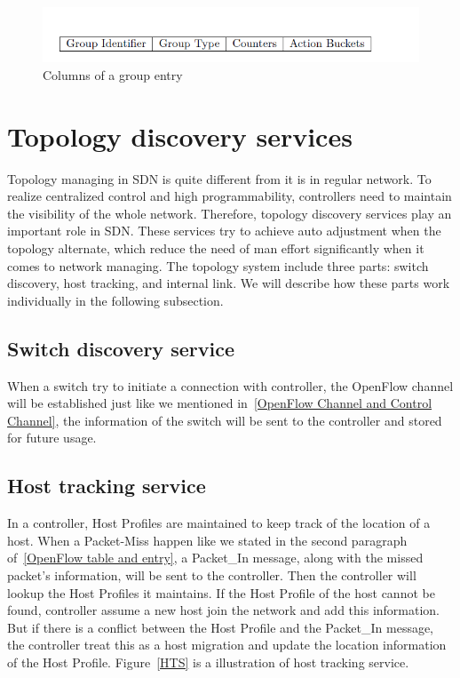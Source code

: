 \begin{figure}[H]
\begin{center} 
\includegraphics[width=1\textwidth]{figures/group_table.png}
\end{center}
\caption{Columns of a group entry}
\label{GE_Col}
\end{figure}

\section{Topology discovery services}
\label{Topology discovery services}
Topology managing in SDN is quite different from it is in regular network. To realize centralized control and high programmability, controllers need to maintain the visibility of the whole network. Therefore, topology discovery services play an important role in SDN. These services try to achieve auto adjustment when the topology alternate, which reduce the need of man effort significantly when it comes to network managing. The topology system include three parts: switch discovery, host tracking, and internal link. We will describe how these parts work individually in the following subsection.

\subsection{Switch discovery service}
\label{Switch discovery service}
When a switch try to initiate a connection with controller, the OpenFlow channel will be established just like we mentioned in~\ref{OpenFlow Channel and Control Channel}, the information of the switch will be sent to the controller and stored for future usage. 

\subsection{Host tracking service}
\label{Host tracking service}
In a controller, Host Profiles are maintained to keep track of the location of a host. When a Packet-Miss happen like we stated in the second paragraph of~\ref{OpenFlow table and entry}, a Packet\_In message, along with the missed packet's information, will be sent to the controller. Then the controller will lookup the Host Profiles it maintains. If the Host Profile of the host cannot be found, controller assume a new host join the network and add this information. But if there is a conflict between the Host Profile and the Packet\_In message, the controller treat this as a host migration and update the location information of the Host Profile. Figure~\ref{HTS} is a illustration of host tracking service.


